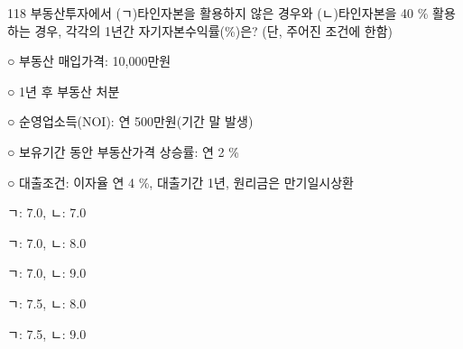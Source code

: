 \begin{question}{118}
부동산투자에서 (ㄱ)타인자본을 활용하지 않은 경우와 (ㄴ)타인자본을 40 \% 활용하는 경우, 각각의 1년간 자기자본수익률(\%)은? (단, 주어진 조건에 한함)
\begin{framedtext}
○ 부동산 매입가격: 10,000만원 \par
○ 1년 후 부동산 처분 \par
○ 순영업소득(NOI): 연 500만원(기간 말 발생) \par
○ 보유기간 동안 부동산가격 상승률: 연 2 \% \par
○ 대출조건: 이자율 연 4 \%, 대출기간 1년, 원리금은 만기일시상환 \par
\end{framedtext}
\begin{choices}
  \item ㄱ: 7.0, ㄴ: 7.0
  \item ㄱ: 7.0, ㄴ: 8.0
  \item ㄱ: 7.0, ㄴ: 9.0
  \item ㄱ: 7.5, ㄴ: 8.0
  \item ㄱ: 7.5, ㄴ: 9.0
\end{choices}
\end{question}
